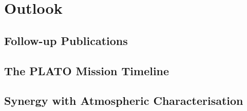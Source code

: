 \chapter{Outlook}
\label{chap:outlook}


\section{Follow-up Publications}
\label{sec:follow_up}


\section{The PLATO Mission Timeline}
\label{sec:plato_timeline}


\section{Synergy with Atmospheric Characterisation}
\label{sec:synergy}

